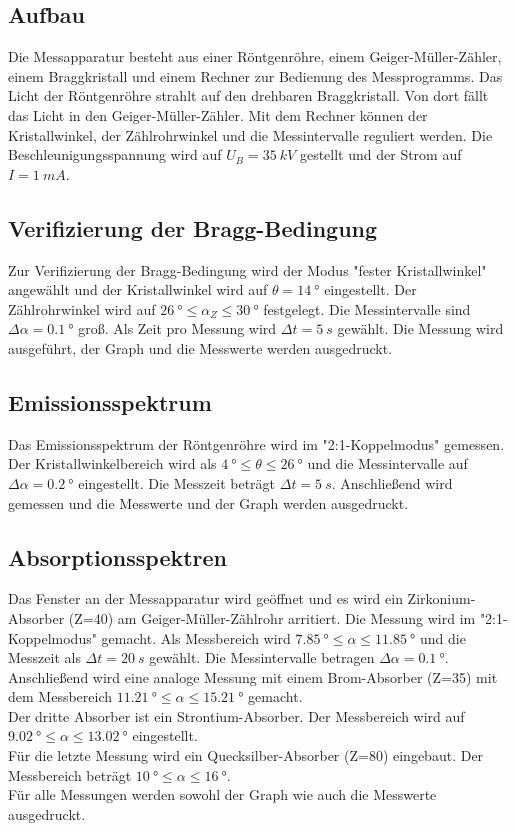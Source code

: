 \subsection{Aufbau}
Die Messapparatur besteht aus einer Röntgenröhre, einem Geiger-Müller-Zähler, einem Braggkristall und einem Rechner zur Bedienung des Messprogramms.
Das Licht der Röntgenröhre strahlt auf den drehbaren Braggkristall.
Von dort fällt das Licht in den Geiger-Müller-Zähler.
Mit dem Rechner können der Kristallwinkel, der Zählrohrwinkel und die Messintervalle reguliert werden.
Die Beschleunigungsspannung wird auf $U_{B}=\SI{35}{kV}$ gestellt und der Strom auf $I=\SI{1}{mA}$.
\subsection{Verifizierung der Bragg-Bedingung}
Zur Verifizierung der Bragg-Bedingung wird der Modus "fester Kristallwinkel" angewählt und der Kristallwinkel wird auf $\theta=\SI{14}{°}$ eingestellt.
Der Zählrohrwinkel wird auf $\SI{26}{°} \le \alpha_{Z} \le \SI{30}{°}$ festgelegt.
Die Messintervalle sind $\Delta \alpha=\SI{0.1}{°}$ groß.
Als Zeit pro Messung wird $\Delta t=\SI{5}{s}$ gewählt.
Die Messung wird ausgeführt, der Graph und die Messwerte werden ausgedruckt.
\subsection{Emissionsspektrum}
Das Emissionsspektrum der Röntgenröhre wird im "2:1-Koppelmodus" gemessen.
Der Kristallwinkelbereich wird als $\SI{4}{°} \le \theta \le \SI{26}{°}$ und die Messintervalle auf $\Delta \alpha = \SI{0.2}{°}$ eingestellt.
Die Messzeit beträgt $\Delta t=\SI{5}{s}$.
Anschließend wird gemessen und die Messwerte und der Graph werden ausgedruckt.
\subsection{Absorptionsspektren}
Das Fenster an der Messapparatur wird geöffnet und es wird ein Zirkonium-Absorber (Z=40) am Geiger-Müller-Zählrohr arritiert.
Die Messung wird im "2:1-Koppelmodus" gemacht.
Als Messbereich wird $\SI{7.85}{°} \le \alpha \le \SI{11.85}{°}$ und die Messzeit als $\Delta t=\SI{20}{s}$ gewählt.
Die Messintervalle betragen $\Delta \alpha = \SI{0.1}{°}$.
\\Anschließend wird eine analoge Messung mit einem Brom-Absorber (Z=35) mit dem Messbereich $\SI{11.21}{°} \le \alpha \le \SI{15.21}{°}$ gemacht.
\\Der dritte Absorber ist ein Strontium-Absorber.
Der Messbereich wird auf $\SI{9.02}{°} \le \alpha \le \SI{13.02}{°}$ eingestellt.
\\Für die letzte Messung wird ein Quecksilber-Absorber (Z=80) eingebaut.
Der Messbereich beträgt $\SI{10}{°} \le \alpha \le \SI{16}{°}$.
\\Für alle Messungen werden sowohl der Graph wie auch die Messwerte ausgedruckt.
\FloatBarrier

